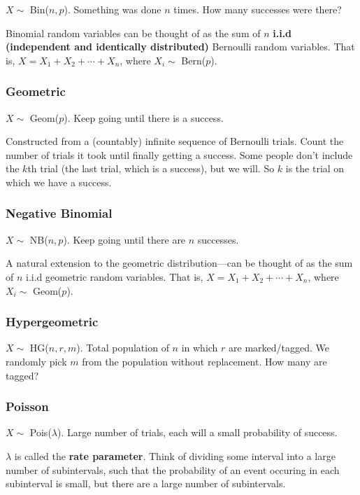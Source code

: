 \documentclass[a4paper,10pt]{article}
\begin{document}
$X \sim$ Bin($n, p$). Something was done $n$ times. How many successes were there?

Binomial random variables can be thought of as the sum of $n$ \textbf{i.i.d (independent and identically distributed)} Bernoulli random variables. That is, $X = X_1 + X_2 + \cdots + X_n$, where $X_i \sim$ Bern($p$).

\subsubsection{Geometric}

$X \sim$ Geom($p$). Keep going until there is a success. 

Constructed from a (countably) infinite sequence of Bernoulli trials. Count the number of trials it took until finally getting a success. Some people don't include the $k$th trial (the last trial, which is a success), but we will. So $k$ is the trial on which we have a success.

\subsubsection{Negative Binomial}

$X \sim$ NB($n, p$). Keep going until there are $n$ successes.

A natural extension to the geometric distribution—can be thought of as the sum of $n$ i.i.d geometric random variables. That is, $X = X_1 + X_2 + \cdots + X_n$, where $X_i \sim$ Geom($p$).

\subsubsection{Hypergeometric}

$X \sim$ HG($n, r, m$). Total population of $n$ in which $r$ are marked/tagged. We randomly pick $m$ from the population without replacement. How many are tagged?

\subsubsection{Poisson}

$X \sim$ Pois($\lambda$). Large number of trials, each will a small probability of success. 

$\lambda$ is called the \textbf{rate parameter}. Think of dividing some interval into a large number of subintervals, such that the probability of an event occuring in each subinterval is small, but there are a large number of subintervals. 
\end{document}
